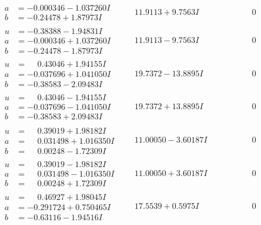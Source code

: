 \documentclass[1p]{elsarticle_modified}
\theoremstyle{definition}
\begin{document}
$$\begin{array}{c|c|c}
\begin{aligned}
a &= -0.000346 - 1.037260 I \\
b &= -0.24478 + 1.87973 I\end{aligned}
 & \phantom{-}11.9113 + 9.7563 I & \phantom{-0.000000 } 0 \\ \hline\begin{aligned}
u &= -0.38388 - 1.94831 I \\
a &= -0.000346 + 1.037260 I \\
b &= -0.24478 - 1.87973 I\end{aligned}
 & \phantom{-}11.9113 - 9.7563 I & \phantom{-0.000000 } 0 \\ \hline\begin{aligned}
u &= \phantom{-}0.43046 + 1.94155 I \\
a &= -0.037696 + 1.041050 I \\
b &= -0.38583 - 2.09483 I\end{aligned}
 & \phantom{-}19.7372 - 13.8895 I & \phantom{-0.000000 } 0 \\ \hline\begin{aligned}
u &= \phantom{-}0.43046 - 1.94155 I \\
a &= -0.037696 - 1.041050 I \\
b &= -0.38583 + 2.09483 I\end{aligned}
 & \phantom{-}19.7372 + 13.8895 I & \phantom{-0.000000 } 0 \\ \hline\begin{aligned}
u &= \phantom{-}0.39019 + 1.98182 I \\
a &= \phantom{-}0.031498 + 1.016350 I \\
b &= \phantom{-}0.00248 - 1.72309 I\end{aligned}
 & \phantom{-}11.00050 - 3.60187 I & \phantom{-0.000000 } 0 \\ \hline\begin{aligned}
u &= \phantom{-}0.39019 - 1.98182 I \\
a &= \phantom{-}0.031498 - 1.016350 I \\
b &= \phantom{-}0.00248 + 1.72309 I\end{aligned}
 & \phantom{-}11.00050 + 3.60187 I & \phantom{-0.000000 } 0 \\ \hline\begin{aligned}
u &= \phantom{-}0.46927 + 1.98045 I \\
a &= -0.291724 + 0.750465 I \\
b &= -0.63116 - 1.94516 I\end{aligned}
 & \phantom{-}17.5539 + 0.5975 I & \phantom{-0.000000 } 0\\

\end{array}$$
\end{document}
